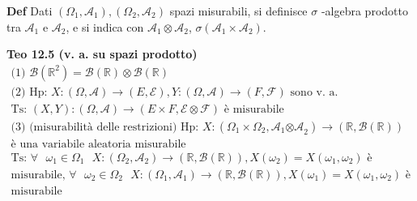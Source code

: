 \documentclass{article}
\begin{document}
\textbf{Def} Dati $\left( \Omega _{1},\mathcal{A}_{1}\right) ,\left( \Omega
_{2},\mathcal{A}_{2}\right) $ spazi misurabili, si definisce $\sigma $%
-algebra prodotto tra $\mathcal{A}_{1}$ e $\mathcal{A}_{2}$, e si indica con 
$\mathcal{A}_{1}\otimes \mathcal{A}_{2}$, $\sigma \left( \mathcal{A}%
_{1}\times \mathcal{A}_{2}\right) $.

\textbf{Teo 12.5 (v. a. su spazi prodotto)}%
\begin{gather*}
\text{(1) }\mathcal{B}\left( 
\mathbb{R}
^{2}\right) =\mathcal{B}\left( 
\mathbb{R}
\right) \otimes \mathcal{B}\left( 
\mathbb{R}
\right) \\
\text{(2) Hp: }X:\left( \Omega ,\mathcal{A}\right) \rightarrow \left( E,%
\mathcal{E}\right) ,Y:\left( \Omega ,\mathcal{A}\right) \rightarrow \left( F,%
\mathcal{F}\right) \text{ sono v. a.} \\
\text{Ts: }\left( X,Y\right) :\left( \Omega ,\mathcal{A}\right) \rightarrow
\left( E\times F,\mathcal{E\otimes F}\right) \text{ \`{e} misurabile} \\
\text{(3) (misurabilit\`{a} delle restrizioni) Hp: }X:\left( \Omega
_{1}\times \Omega _{2},\mathcal{A}_{1}\mathcal{\otimes A}_{2}\right)
\rightarrow \left( 
\mathbb{R}
,\mathcal{B}\left( 
\mathbb{R}
\right) \right) \\
\text{\`{e} una variabile aleatoria misurabile} \\
\text{Ts: }\forall \text{ }\omega _{1}\in \Omega _{1}\text{ }X:\left( \Omega
_{2},\mathcal{A}_{2}\right) \rightarrow \left( 
\mathbb{R}
,\mathcal{B}\left( 
\mathbb{R}
\right) \right) ,X\left( \omega _{2}\right) =X\left( \omega _{1},\omega
_{2}\right) \text{ \`{e}} \\
\text{misurabile, }\forall \text{ }\omega _{2}\in \Omega _{2}\text{ }%
X:\left( \Omega _{1},\mathcal{A}_{1}\right) \rightarrow \left( 
\mathbb{R}
,\mathcal{B}\left( 
\mathbb{R}
\right) \right) ,X\left( \omega _{1}\right) =X\left( \omega _{1},\omega
_{2}\right) \text{ \`{e}} \\
\text{misurabile}
\end{gather*}
\end{document}
